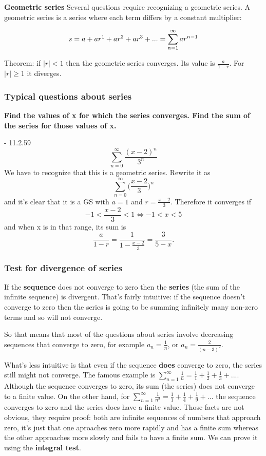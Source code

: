 \textbf{Geometric series}
Several questions require recognizing a geometric series. A geometric series is a series where each term differs by a constant multiplier:

$$
s = a + ar^1 + ar^2 + ar^3 + ... = \sum_{n=1}^{\infty} ar^{n-1}
$$

Theorem: if $|r| < 1$ then the geometric series converges. Its value is $\frac{a}{1-r}$. For $|r| \geq 1$ it diverges.

\subsubsection{Typical questions about series}

\textbf{Find the values of x for which the series converges. Find the sum of the series for those values of x.}

- 11.2.59
  $$
  \sum_{n=0}^{\infty} \frac{(x-2)^n}{3^n}
  $$
  We have to recognize that this is a geometric series. Rewrite it as
  $$
  \sum_{n=0}^{\infty} \Big(\frac{x-2}{3}\Big)^n
  $$
  and it's clear that it is a GS with $a=1$ and $r=\frac{x-2}{3}$. Therefore it converges if
  $$
  -1 < \frac{x-2}{3} < 1 \Leftrightarrow -1 < x < 5
  $$
  and when x is in that range, its sum is
  $$
  \frac{a}{1-r} = \frac{1}{1 - \frac{x-2}{3}} = \frac{3}{5-x}.
  $$

\subsubsection{Test for divergence of series}
If the \textbf{sequence} does not converge to zero then the \textbf{series} (the sum of the infinite sequence) is divergent. That's fairly intuitive: if the sequence doesn't converge to zero then the series is going to be summing infinitely many non-zero terms and so will not converge.

So that means that most of the questions about series involve decreasing sequences that converge to zero, for example $a_n = \frac{1}{n}$, or $a_n = \frac{2}{(n-3)^2}$.

What's less intuitive is that even if the sequence \textbf{does} converge to zero, the series still might not converge. The famous example is $\sum_{n=1}^\infty \frac{1}{n} = \frac{1}{1} + \frac{1}{2} + \frac{1}{3} + ...$. Although the sequence converges to zero, its sum (the series) does not converge to a finite value. On the other hand, for $\sum_{n=1}^\infty \frac{1}{n^2} = \frac{1}{1} + \frac{1}{4} + \frac{1}{9} + ...$ the sequence converges to zero and the series does have a finite value. Those facts are not obvious, they require proof: both are infinite sequences of numbers that approach zero, it's just that one aproaches zero more rapidly and has a finite sum whereas the other approaches more slowly and fails to have a finite sum. We can prove it using the \textbf{integral test}.

